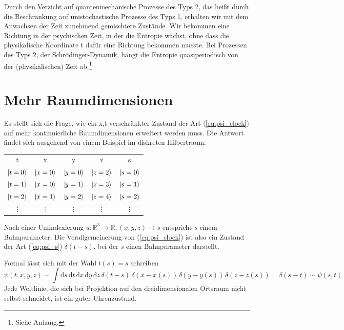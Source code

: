\documentclass[12pt]{article}
\begin{document}
Durch den Verzicht auf quantenmechanische Prozesse des Typs 2, das heißt durch die Beschränkung auf unistochastische Prozesse des Typs 1, erhalten wir mit dem Anwachsen der Zeit zunehmend gemischtere Zustände. Wir bekommen eine Richtung in der psychischen Zeit, in der die Entropie wächst, ohne dass die physikalische Koordinate t dafür eine Richtung bekommen musste. Bei Prozessen des Typs 2, der Schrödinger-Dynamik, hängt die Entropie quasiperiodisch von der (physikalischen) Zeit ab.\footnote{Siehe Anhang.}

\section{Mehr Raumdimensionen}

Es stellt sich die Frage, wie ein x,t-verschränkter Zustand der Art (\ref{eq:psi_clock}) auf mehr kontinuierliche Raumdimensionen erweitert werden muss. Die Antwort findet sich ausgehend von einem Beispiel im diskreten Hilbertraum.
\begin{center}
\begin{tabular}{ |c|c|c|c|c| } 
 \hline
 t & x & y & z & s \\ 
 $\ket{t=0}$ & $\ket{x=0}$ & $\ket{y=0}$ & $\ket{z=2}$ & $\ket{s=0}$  \\
 $\ket{t=1}$ & $\ket{x=0}$ & $\ket{y=1}$ & $\ket{z=3}$ & $\ket{s=1}$  \\
 $\ket{t=2}$ & $\ket{x=1}$ & $\ket{y=2}$ & $\ket{z=4}$ & $\ket{s=2}$  \\
 $\vdots$ & $\vdots$ & $\vdots$ & $\vdots$ & $\vdots$ \\
 \hline
\end{tabular}
\end{center}
Nach einer Umindexierung $u: \mathbb{R}^3 \rightarrow \mathbb{R}, (x,y,z) \mapsto s$ entspricht $s$ einem Bahnparameter. Die Verallgemeinerung von (\ref{eq:psi_clock}) ist also ein Zustand der Art (\ref{eq:psi_s}) $\delta(t-s)$, bei der $s$ einen Bahnparameter darstellt.

Formal lässt sich mit der Wahl $t(s) = s$ schreiben
\begin{equation} 
\label{eq:psi_clock_3d_space}
\psi(t,x,y,z) \sim \int \mathrm ds \, \mathrm dt \, \mathrm dx \, \mathrm dy \, \mathrm dz \, \delta(t-s) \, \delta(x-x(s)) \, \delta(y-y(s)) \, \delta(z-z(s)) = \delta(s-t) \sim \psi(s,t)
\end{equation}
Jede Weltlinie, die sich bei Projektion auf den dreidimensionalen Ortsraum nicht selbst schneidet, ist ein guter Uhrenzustand. 
\end{document}
